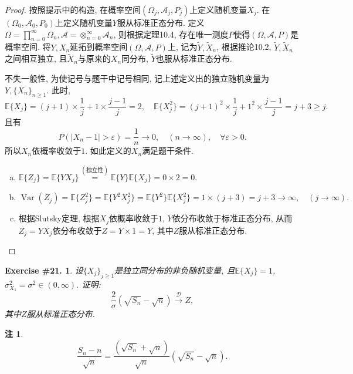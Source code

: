 \documentclass[UTF8, a4paper]{article}
\newtheorem{exercise}{Exercise \#21.}
\newtheorem*{remark}{注}
\begin{document}
\begin{proof}
按照提示中的构造, 在概率空间\((\Omega_j, \mathcal{A}_j, P_j)\)上定义随机变量\(X_j\). 在\((\Omega_0, \mathcal{A}_0, P_0)\)上定义随机变量\(Y\)服从标准正态分布.
定义\(\Omega = \prod_{n=0}^{\infty} \Omega_n, \mathcal{A} = \otimes_{n=0}^\infty \mathcal{A}_n\), 则根据定理10.4, 存在唯一测度\(P\)使得\((\Omega, \mathcal{A}, P)\)是概率空间. 将\(Y, X_n\)延拓到概率空间\((\Omega, \mathcal{A}, P)\)上, 记为\(\tilde{Y}, \tilde{X}_n\), 根据推论10.2, \(\tilde{Y}, \tilde{X}_n\)之间相互独立, 且\(\tilde{X}_n\)与原来的\(X_n\)同分布, \(\tilde{Y}\)也服从标准正态分布.

不失一般性, 为使记号与题干中记号相同, 记上述定义出的独立随机变量为\(Y, \{X_n\}_{n\geq 1}\).
此时, 
$$
\mathbb{E}\{X_j\} = (j+1) \times \frac{1}{j} + 1 \times \frac{j-1}{j} = 2, \quad \mathbb{E}\{X_j^2\} = (j+1)^2 \times \frac{1}{j} + 1^2 \times \frac{j-1}{j} = j+3 \geq j.
$$
且有
$$
{P}(|X_n - 1| > \varepsilon) = \frac{1}{n} \to 0, \quad (n \to \infty), \quad \forall \varepsilon > 0.
$$
所以\(X_n\)依概率收敛于\(1\). 如此定义的\(X_n\)满足题干条件.

\begin{enumerate}[a)]
    \item \(\mathbb{E}\{Z_j\} = \mathbb{E}\{YX_j\} \overset{(\text{独立性})}{=} \mathbb{E}\{Y\} \mathbb{E}\{X_j\} = 0 \times 2 = 0.\)
    \item \(\operatorname{Var}(Z_j) = \mathbb{E}\{Z_j^2\} = \mathbb{E}\{Y^2X_j^2\} = \mathbb{E}\{Y^2\} \mathbb{E}\{X_j^2\} = 1 \times (j+3) = j+3 \to \infty, \quad (j \to \infty).\)
    \item 根据Slutsky定理, 根据\(X_j\)依概率收敛于\(1\), \(Y\)依分布收敛于标准正态分布, 从而\(Z_j = YX_j\)依分布收敛于\(Z = Y \times 1 = Y\), 其中\(Z\)服从标准正态分布.
\end{enumerate}


\end{proof}


\begin{framed}
\begin{exercise}
设\(\{X_j\}_{j\geq 1}\)是独立同分布的非负随机变量, 且\(\mathbb{E}\{X_j\} = 1\), \(\sigma_{X_1}^2 = \sigma^2 \in(0, \infty)\).
证明: 
$$
\frac{2}{\sigma}\left(\sqrt{S_n}-\sqrt{n}\right) \xrightarrow{\mathcal{D}} Z,
$$
其中\(Z\)服从标准正态分布.
\end{exercise}
\end{framed}
\begin{remark}
$$
\frac{S_n-n}{\sqrt{n}}=\frac{\left(\sqrt{S_n}+\sqrt{n}\right)}{\sqrt{n}}\left(\sqrt{S_n}-\sqrt{n}\right) .
$$
\end{remark}
\end{document}
